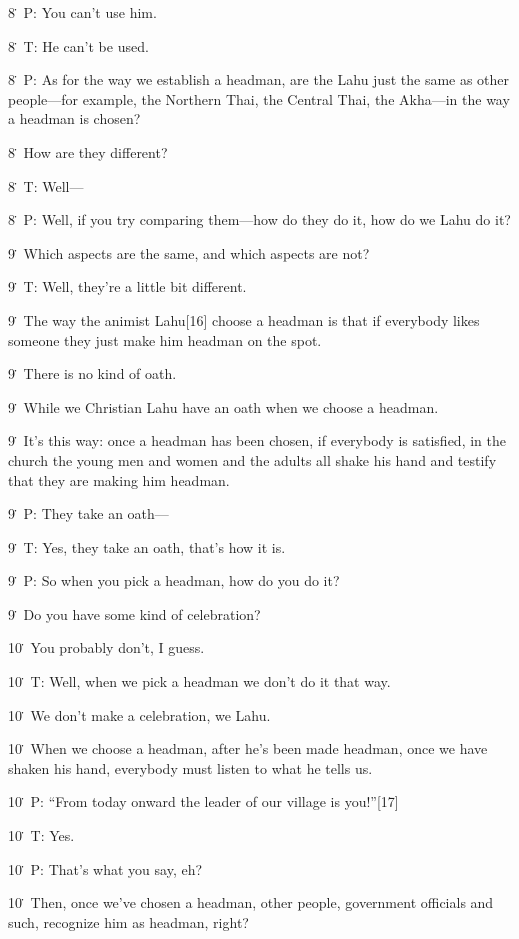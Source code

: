 {8\. P: You can't use him.}

{8\. T: He can't be used.}

{8\. P: As for the way we establish a headman, are the Lahu just the same
as other people---for example, the Northern Thai, the Central Thai, the Akha---in
the way a headman is chosen?}

{8\. How are they different?}

{8\. T: Well---}

{8\. P: Well, if you try comparing them---how do they do it, how do we Lahu
do it?}

{9\. Which aspects are the same, and which aspects are not?}

{9\. T: Well, they're a little bit different.}

{9\. The way the animist Lahu[16] choose a headman is that if everybody
likes someone they just make him headman on the spot.}

{9\. There is no kind of oath.}

{9\. While we Christian Lahu have an oath when we choose a headman.}

{9\. It's this way: once a headman has been chosen, if everybody is satisfied,
in the church the young men and women and the adults all shake his hand and testify
that they are making him headman.}

{9\. P: They take an oath---}

{9\. T: Yes, they take an oath, that's how it is.}

{9\. P: So when you pick a headman, how do you do it?}

{9\. Do you have some kind of celebration?}

{10\. You probably don't, I guess.}

{10\. T: Well, when we pick a headman we don't do it that way.}

{10\. We don't make a celebration, we Lahu.}

{10\. When we choose a headman, after he's been made headman, once we have
shaken his hand, everybody must listen to what he tells us.}

{10\. P: ``From today onward the leader of our village is you!''[17]}

{10\. T: Yes.}

{10\. P: That's what you say, eh?}

{10\. Then, once we've chosen a headman, other people, government officials
and such, recognize him as headman, right?}

